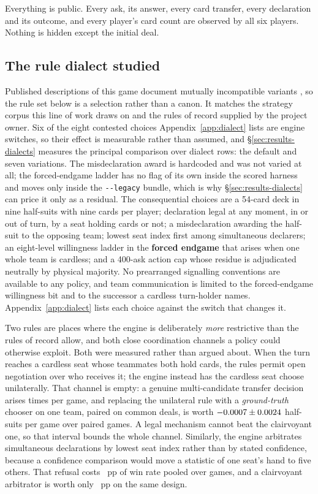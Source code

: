 Everything is public. Every ask, its answer, every card transfer, every declaration and its outcome,
and every player's card count are observed by all six players. Nothing is hidden except the initial
deal.

\subsection{The rule dialect studied}
\label{sec:game-dialect}

Published descriptions of this game document mutually incompatible variants \cite{pagat}, so the rule
set below is a selection rather than a canon. It matches the strategy corpus this line of work draws
on \cite{develin} and the rules of record supplied by the project owner. Six of the eight contested choices Appendix~\ref{app:dialect} lists are engine
switches, so their effect is measurable rather than assumed, and \S\ref{sec:results-dialects}
measures the principal comparison over \vsevenDiaRowsWord{} dialect rows: the default and seven
variations. The misdeclaration award is hardcoded and was not varied at all; the forced-endgame
ladder has no flag of its own inside the scored harness and moves only inside the
\texttt{-{}-legacy} bundle, which is why \S\ref{sec:results-dialects} can price it only as a
residual. The consequential choices are a
54-card deck in nine half-suits with nine cards per player; declaration legal at any moment, in or out
of turn, by a seat holding cards or not; a misdeclaration awarding the half-suit to the opposing team;
lowest seat index first among simultaneous declarers; an eight-level willingness ladder in the
\textbf{forced endgame} that arises when one whole team is cardless; and a 400-ask action cap whose
residue is adjudicated neutrally by physical majority. No prearranged signalling conventions are
available to any policy, and team communication is limited to the forced-endgame willingness bit and
to the successor a cardless turn-holder names. Appendix~\ref{app:dialect} lists each choice against
the switch that changes it.

Two rules are places where the engine is deliberately \emph{more} restrictive than the rules of
record allow, and both close coordination channels a policy could otherwise exploit. Both were
measured rather than argued about. When the turn reaches a cardless seat whose teammates both hold
cards, the rules permit open negotiation over who receives it; the engine instead has the cardless
seat choose unilaterally. That channel is empty: a genuine multi-candidate transfer decision arises
\numTransferEvents{} times per game, and replacing the unilateral rule with a \emph{ground-truth}
chooser on one team, paired on common deals, is worth $-0.0007 \pm 0.0024$
half-suits per game over \numTransferGames{} paired games. A legal mechanism cannot beat the
clairvoyant one, so that interval bounds the whole channel. Similarly, the engine arbitrates
simultaneous declarations by lowest seat index rather than by stated confidence, because a confidence
comparison would move a statistic of one seat's hand to five others. That refusal costs
\numArbCost{}~pp of win rate pooled over \numArbGames{} games, and a clairvoyant arbitrator is worth
only \numArbOracle{}~pp on the same design.

